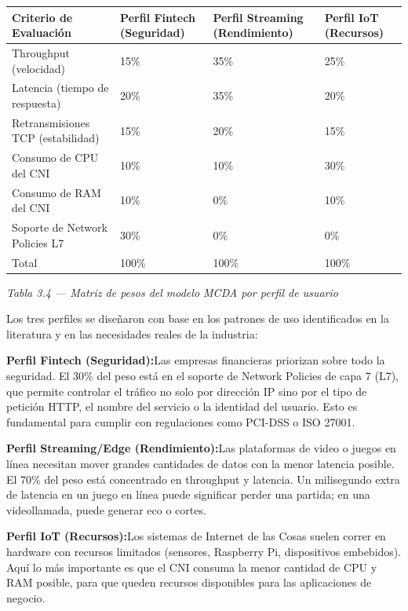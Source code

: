 \documentclass[journal]{IEEEtran}
\begin{document}
\begin{table}[htbp]
\centering
\scriptsize
\begin{tabularx}{\textwidth}{|Y|Y|Y|Y|}
\hline
\textbf{Criterio de Evaluación} & \textbf{Perfil Fintech (Seguridad)} & \textbf{Perfil Streaming (Rendimiento)} & \textbf{Perfil IoT (Recursos)} \\
\hline
Throughput (velocidad) & 15\% & 35\% & 25\% \\
Latencia (tiempo de respuesta) & 20\% & 35\% & 20\% \\
Retransmisiones TCP (estabilidad) & 15\% & 20\% & 15\% \\
Consumo de CPU del CNI & 10\% & 10\% & 30\% \\
Consumo de RAM del CNI & 10\% & 0\% & 10\% \\
Soporte de Network Policies L7 & 30\% & 0\% & 0\% \\
Total & 100\% & 100\% & 100\% \\
\hline
\end{tabularx}
\end{table}

\begin{center}\emph{\emph{Tabla 3.4 --- Matriz de pesos del modelo MCDA por perfil de usuario}}\end{center}

Los tres perfiles se diseñaron con base en los patrones de uso identificados en la literatura y en las necesidades reales de la industria:

\textbf{Perfil Fintech (Seguridad):}Las empresas financieras priorizan sobre todo la seguridad. El 30\% del peso está en el soporte de Network Policies de capa 7 (L7), que permite controlar el tráfico no solo por dirección IP sino por el tipo de petición HTTP, el nombre del servicio o la identidad del usuario. Esto es fundamental para cumplir con regulaciones como PCI-DSS o ISO 27001.

\textbf{Perfil Streaming/Edge (Rendimiento):}Las plataformas de video o juegos en línea necesitan mover grandes cantidades de datos con la menor latencia posible. El 70\% del peso está concentrado en throughput y latencia. Un milisegundo extra de latencia en un juego en línea puede significar perder una partida; en una videollamada, puede generar eco o cortes.

\textbf{Perfil IoT (Recursos):}Los sistemas de Internet de las Cosas suelen correr en hardware con recursos limitados (sensores, Raspberry Pi, dispositivos embebidos). Aquí lo más importante es que el CNI consuma la menor cantidad de CPU y RAM posible, para que queden recursos disponibles para las aplicaciones de negocio.
\end{document}
